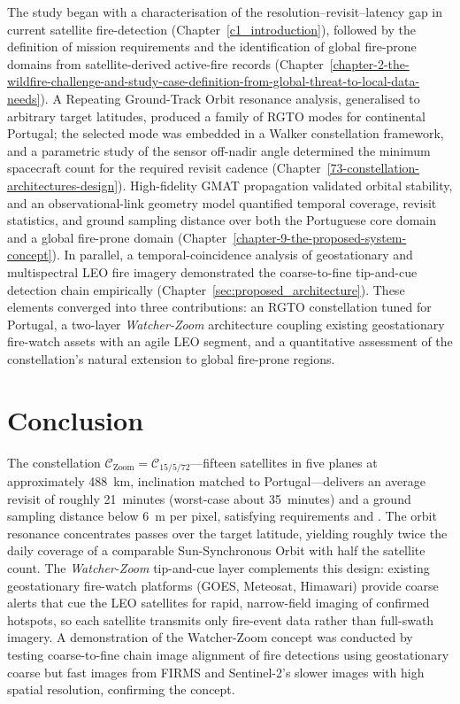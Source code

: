 The study began with a characterisation of the resolution--revisit--latency gap in current satellite fire-detection (Chapter~\ref{c1_introduction}), followed by the definition of mission requirements and the identification of global fire-prone domains from satellite-derived active-fire records (Chapter~\ref{chapter-2-the-wildfire-challenge-and-study-case-definition-from-global-threat-to-local-data-needs}).  A Repeating Ground-Track Orbit resonance analysis, generalised to arbitrary target latitudes, produced a family of RGTO modes for continental Portugal; the selected mode was embedded in a Walker constellation framework, and a parametric study of the sensor off-nadir angle determined the minimum spacecraft count for the required revisit cadence (Chapter~\ref{73-constellation-architectures-design}).  High-fidelity GMAT propagation validated orbital stability, and an observational-link geometry model quantified temporal coverage, revisit statistics, and ground sampling distance over both the Portuguese core domain and a global fire-prone domain (Chapter~\ref{chapter-9-the-proposed-system-concept}).  In parallel, a temporal-coincidence analysis of geostationary and multispectral LEO fire imagery demonstrated the coarse-to-fine tip-and-cue detection chain empirically (Chapter~\ref{sec:proposed_architecture}).  These elements converged into three contributions: an RGTO constellation tuned for Portugal, a two-layer \emph{Watcher-Zoom} architecture coupling existing geostationary fire-watch assets with an agile LEO segment, and a quantitative assessment of the constellation's natural extension to global fire-prone regions.



\section{Conclusion}\label{sec:conclusion-answer}

The constellation $\mathcal{C}_{\text{Zoom}} = \mathcal{C}_{15/5/72}$---fifteen satellites in five planes at approximately 488~km, inclination matched to Portugal---delivers an average revisit of roughly 21~minutes (worst-case about 35~minutes) and a ground sampling distance below 6~m per pixel, satisfying requirements  and .  The orbit resonance concentrates passes over the target latitude, yielding roughly twice the daily coverage of a comparable Sun-Synchronous Orbit with half the satellite count.  The \emph{Watcher-Zoom} tip-and-cue layer complements this design: existing geostationary fire-watch platforms (GOES, Meteosat, Himawari) provide coarse alerts that cue the LEO satellites for rapid, narrow-field imaging of confirmed hotspots, so each satellite transmits only fire-event data rather than full-swath imagery.   A demonstration of the Watcher-Zoom concept was conducted by testing coarse-to-fine chain image alignment of fire detections using geostationary coarse but fast images from FIRMS and Sentinel-2's slower images with high spatial resolution, confirming the concept.

